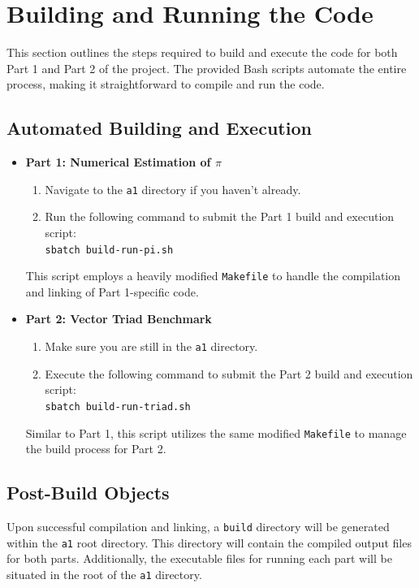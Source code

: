 \documentclass{article}
\begin{document}
\section{Building and Running the Code}

This section outlines the steps required to build and execute the code for both Part 1 and Part 2 of the project. The provided Bash scripts automate the entire process, making it straightforward to compile and run the code.

\subsection{Automated Building and Execution}
\begin{itemize}
    \item \textbf{Part 1: Numerical Estimation of \(\pi\)} 
    \begin{enumerate}
        \item Navigate to the \texttt{a1} directory if you haven't already.
        \item Run the following command to submit the Part 1 build and execution script: \\
        \texttt{sbatch build-run-pi.sh}
    \end{enumerate}
    This script employs a heavily modified \texttt{Makefile} to handle the compilation and linking of Part 1-specific code.
    
    \item \textbf{Part 2: Vector Triad Benchmark}
    \begin{enumerate}
        \item Make sure you are still in the \texttt{a1} directory.
        \item Execute the following command to submit the Part 2 build and execution script: \\
        \texttt{sbatch build-run-triad.sh}
    \end{enumerate}
    Similar to Part 1, this script utilizes the same modified \texttt{Makefile} to manage the build process for Part 2.
\end{itemize}

\subsection{Post-Build Objects}
Upon successful compilation and linking, a \texttt{build} directory will be generated within the \texttt{a1} root directory. This directory will contain the compiled output files for both parts. Additionally, the executable files for running each part will be situated in the root of the \texttt{a1} directory.
\end{document}
